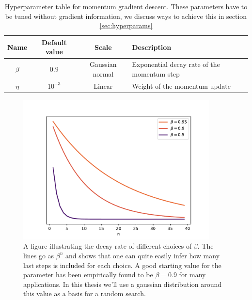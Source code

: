 \begin{table}
\begin{tabular}{cccl}
\toprule
Name &Default value & Scale  & Description\\
\midrule
$\beta$  & $0.9$ & Gaussian normal & Exponential decay rate of the momentum step\\
$\eta$  & $10^{-3}$ & Linear & Weight of the momentum update \\
\bottomrule
\end{tabular}
\caption{Hyperparameter table for momentum gradient descent. These parameters have to be tuned without gradient information, we discuss ways to achieve this in section \ref{sec:hyperparams}}\label{tab:momentum}
\end{table}


\begin{figure}
\centering
\includegraphics[height=3in]{../figures/beta_decay.pdf}
\caption{A figure illustrating the decay rate of different choices of $\beta$. The lines go as $\beta^n$ and shows that one can quite easily infer how many last steps is included for each choice. A good starting value for the parameter has been empirically found to be $\beta=0.9$ for many applications. In this thesis we'll use a gaussian distribution around this value as a basis for a random search.}\label{fig:beta}
\end{figure}

